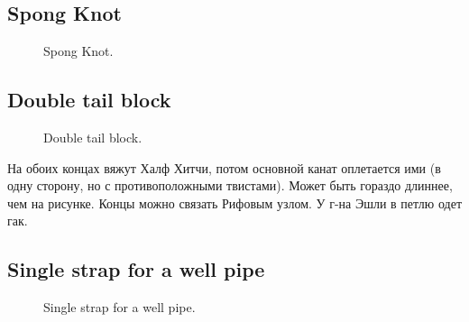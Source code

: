\subsection{Spong Knot}

\begin{figure}[H]\centering
	\begin{minipage}{1\linewidth}
		\begin{center}
			\tcbox[enhanced jigsaw,colframe=black,opacityframe=0.5,opacityback=0.5]
			{\centering{}}
		\end{center}
	\end{minipage}
\caption{Spong Knot.}
\label{ris:Spong_Knot}
\end{figure}

\subsection{Double tail block}

\begin{figure}[H]\centering
	\begin{minipage}{1\linewidth}
		\begin{center}
			\tcbox[enhanced jigsaw,colframe=black,opacityframe=0.5,opacityback=0.5]
			{\centering{}}
		\end{center}
	\end{minipage}
\caption{Double tail block.}
\label{ris:Double_tail_block}
\end{figure}

На обоих концах вяжут Халф Хитчи, потом основной канат оплетается ими (в одну сторону, но с противоположными твистами). Может быть гораздо длиннее, чем на рисунке. Концы можно связать Рифовым узлом. У г-на Эшли в петлю одет гак.

\subsection{Single strap for a well pipe}

\begin{figure}[H]\centering
	\begin{minipage}{1\linewidth}
		\begin{center}
			\tcbox[enhanced jigsaw,colframe=black,opacityframe=0.5,opacityback=0.5]
			{\centering{}}
		\end{center}
	\end{minipage}
\caption{Single strap for a well pipe.}
\label{ris:Single_strap_for_a_well_pipe}
\end{figure}

